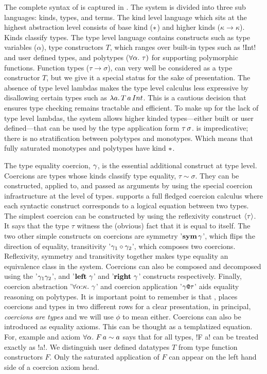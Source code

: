 \documentclass[manuscript,screen,nonacm]{acmart}
\begin{document}
The complete syntax of \SFC is captured in . The system is divided into three sub languages: kinds, types, and terms. The kind level language which sits at the highest abstraction level consists of base kind ($\ast$) and higher kinds ($\kappa \to \kappa$). Kinds classify types. The type level language contains constructs such as type variables ($\alpha$), type constructors $T$, which ranges over built-in types such as !Int! and user defined types, and polytypes ($\forall\alpha.~\tau)$ for supporting polymorphic functions. Function types ($\tau \to \sigma$), can very well be considered as a type constructor $T$, but we give it a special status for the sake of presentation. The absence of type level lambdas makes the type level calculus less expressive by disallowing certain types such as $\lambda a.\, T\, a\, Int$. This is a cautious decision that ensures type checking remains tractable and efficient. To make up for the lack of type level lambdas, the system allows higher kinded types---either built or user defined---that can be used by the type application form $\tau\,\sigma$. \SFC is impredicative; there is no stratification between polytypes and monotypes. Which means that fully saturated monotypes and polytypes have kind $\ast$.

The type equality coercion, $\gamma$, is the essential additional construct at type level. Coercions are types whose kinds classify type equality, $\tau\sim\sigma$. They can be constructed, applied to, and passed as arguments by using the special coercion infrastructure at the level of types. \SFC supports a full fledged coercion calculus where each syntactic construct corresponds to a logical equation between two types. The simplest coercion can be constructed by using the reflexivity construct $\langle{\tau}\rangle$. It says that the type $\tau$ witness the (obvious) fact that it is equal to itself. The two other simple constructs on coercions are symmetry '$\textbf{sym}\,{\gamma}$', which flips the direction of equality, transitivity '${\gamma_1} \circ {\gamma_2}$', which composes two coercions. Reflexivity, symmetry and transitivity together makes type equality an equivalence class in the system. Coercions can also be composed and decomposed using the '$\gamma_1\gamma_2$', and '$\textbf{left}~\gamma$' and '$\textbf{right}~\gamma$' constructs respectively. Finally, coercion abstraction '$\forall\alpha{:}\kappa.~\gamma$' and coercion application '$\gamma\texttt{@}\tau$' aids equality reasoning on polytypes. It is important point to remember is that , places coercions and types in two different rows for a clear presentation, in principal, \emph{coercions are types} and we will use $\phi$ to mean either. Coercions can also be introduced as equality axioms. This can be thought as a templatized equation. For, example and axiom $\forall\alpha.~F\, a \sim a$ says that for all types, !F a! can be treated exactly as !a!. We distinguish user defined datatypes $T$ from type function constructors $F$. Only the saturated application of $F$ can appear on the left hand side of a coercion axiom head.
\end{document}
